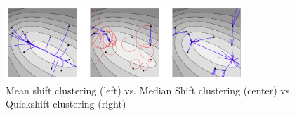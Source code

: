 \begin{figure}[hbt]
    \centering
    \includegraphics[width=0.8\textwidth]{MeanshiftMedianshiftQuickshift}
    \caption{Mean shift clustering (left) vs. Median Shift clustering (center) vs. Quickshift clustering (right)}
    \label{fig:meanshift_median_shift_quickshift}
\end{figure}



